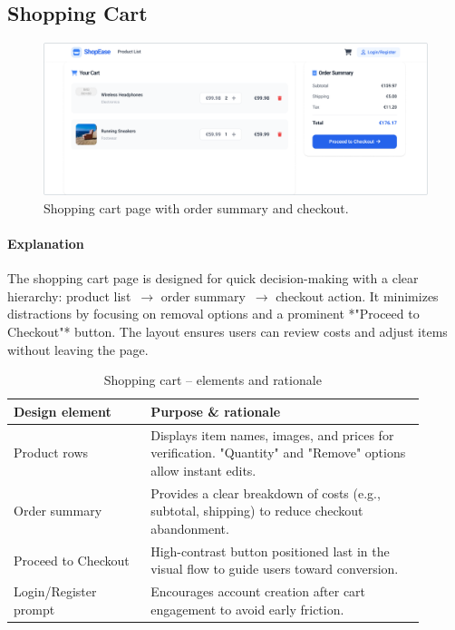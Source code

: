 \documentclass[11pt,a4paper]{article}
\begin{document}

	\subsection{Shopping Cart}\label{subsec:shopping-cart}

	\begin{figure}[H]
		\centering
		\includegraphics[width=\linewidth]{pictures/main/CartPage_Figma}%
		\caption{Shopping cart page with order summary and checkout.}
		\label{fig:ui-cart}
	\end{figure}

	\paragraph{Explanation}%
	The shopping cart page is designed for quick decision-making with a clear hierarchy:
	product list~$\rightarrow$ order summary~$\rightarrow$ checkout action. It minimizes distractions
	by focusing on removal options and a prominent *"Proceed to Checkout"* button.
	The layout ensures users can review costs and adjust items without leaving the page.

	\begin{table}[H]
		\centering
		\caption{Shopping cart – elements and rationale}
		\label{tab:cart-elements}

		\begin{tabular}{p{0.30\linewidth} p{0.60\linewidth}}
        	\toprule
        	\textbf{Design element} & \textbf{Purpose \& rationale} \\ \midrule
				Product rows            & Displays item names, images, and prices for verification. "Quantity" and "Remove" options allow instant edits. \\
        		Order summary           & Provides a clear breakdown of costs (e.g., subtotal, shipping) to reduce checkout abandonment. \\
        		Proceed to Checkout  & High-contrast button positioned last in the visual flow to guide users toward conversion. \\
        		Login/Register prompt   & Encourages account creation after cart engagement to avoid early friction. \\
        	\bottomrule
    	\end{tabular}

	\end{table}
\end{document}
